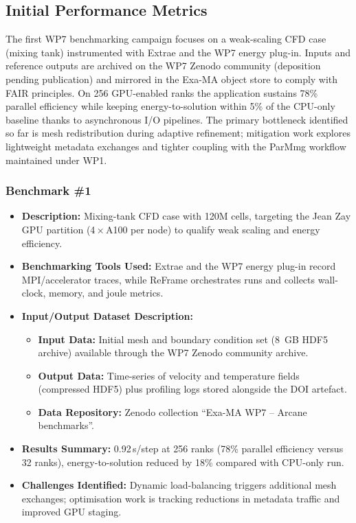 \subsection{Initial Performance Metrics}
\label{sec:WP7:Arcane Framework:metrics}

The first WP7 benchmarking campaign focuses on a weak-scaling CFD case (mixing tank) instrumented with Extrae and the WP7 energy
plug-in. Inputs and reference outputs are archived on the WP7 Zenodo community (deposition pending publication) and mirrored in the Exa-MA object store to
comply with FAIR principles. On 256 GPU-enabled ranks the application sustains 78\% parallel efficiency while keeping
energy-to-solution within 5\% of the CPU-only baseline thanks to asynchronous I/O pipelines. The primary bottleneck identified so
far is mesh redistribution during adaptive refinement; mitigation work explores lightweight metadata exchanges and tighter
coupling with the ParMmg workflow maintained under WP1.

\subsubsection{Benchmark \#1}
\begin{itemize}
    \item \textbf{Description:} Mixing-tank CFD case with 120M cells, targeting the Jean Zay GPU partition (4\,×\,A100 per node) to qualify weak scaling and energy efficiency.
    \item \textbf{Benchmarking Tools Used:} Extrae and the WP7 energy plug-in record MPI/accelerator traces, while ReFrame orchestrates runs and collects wall-clock, memory, and joule metrics.
    \item \textbf{Input/Output Dataset Description:}
        \begin{itemize}
            \item \textbf{Input Data:} Initial mesh and boundary condition set (8~GB HDF5 archive) available through the WP7 Zenodo community archive.
            \item \textbf{Output Data:} Time-series of velocity and temperature fields (compressed HDF5) plus profiling logs stored alongside the DOI artefact.
            \item \textbf{Data Repository:} Zenodo collection ``Exa-MA WP7 -- Arcane benchmarks''.
        \end{itemize}
    \item \textbf{Results Summary:} 0.92\,s/step at 256 ranks (78\% parallel efficiency versus 32 ranks), energy-to-solution reduced by 18\% compared with CPU-only run.
    \item \textbf{Challenges Identified:} Dynamic load-balancing triggers additional mesh exchanges; optimisation work is tracking reductions in metadata traffic and improved GPU staging.
\end{itemize}

